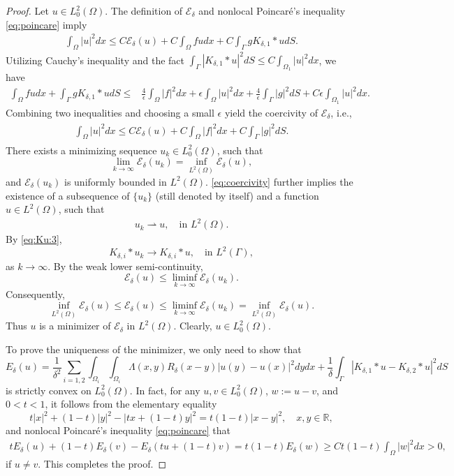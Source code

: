 \documentclass[10pt,a4paper]{amsart}
\newcommand{\R}{\mathbb{R}}
\begin{document}
\begin{proof}
  Let $u\in L^2_0(\Omega)$.
  The definition of $\mathcal{E}_\delta$ and nonlocal Poincar\'{e}'s inequality \eqref{eq:poincare} imply
  \begin{align*}
    \int_\Omega |u|^2dx
    \leq C\mathcal{E}_\delta(u)
    +C\int_{\Omega}fudx + C\int_\Gamma g K_{\delta,1}\ast u dS.
  \end{align*}
  Utilizing Cauchy's inequality and the fact
  $\int_\Gamma |K_{\delta,1}\ast u|^2dS\leq C\int_{\Omega_1}|u|^2dx$,
  we have
  \begin{align*}
  \int_{\Omega}fudx + \int_\Gamma gK_{\delta,1}\ast u dS
  \leq& \frac{4}{\epsilon}\int_\Omega |f|^2dx
  +\epsilon\int_\Omega |u|^2dx
  +\frac{4}{\epsilon}\int_\Gamma |g|^2dS
  +C\epsilon \int_{\Omega_1}|u|^2dx.
  \end{align*}
  Combining two inequalities and choosing a small $\epsilon$ yield the coercivity of $\mathcal{E}_\delta$, i.e.,
    \begin{align}\label{eq:coercivity}
  \begin{split}
    \int_\Omega|u|^2dx
    \leq C\mathcal{E}_\delta(u)+C\int_\Omega |f|^2dx + C\int_\Gamma |g|^2dS.
  \end{split}
  \end{align}
There exists a minimizing sequence $u_k\in L_0^2(\Omega)$, such that
\[
\lim_{k\rightarrow\infty}\mathcal{E}_\delta(u_k)=\inf_{L^2(\Omega)} \mathcal{E}_\delta(u),
\]
and $\mathcal{E}_\delta(u_k)$ is uniformly bounded in $L^2(\Omega)$.
\eqref{eq:coercivity} further implies the existence of a subsequence of $\{u_k\}$ (still denoted by itself) and a function $u\in L^2(\Omega)$, such that
\begin{align*}
  u_{k} \rightharpoonup {u}, \quad \mbox{in } L^2(\Omega).
\end{align*}
By \eqref{eq:Ku:3},
  \[
  K_{\delta,i}\ast u_k\rightarrow K_{\delta,i}\ast u, \quad \mbox{in } L^2(\Gamma),
  \]
  as $k\rightarrow \infty$.
 By the weak lower semi-continuity,
\[
\mathcal{E}_\delta(u)
\leq \liminf_{k\rightarrow\infty}\mathcal{E}_\delta(u_k).
\]
Consequently,
\[
\inf_{L^2(\Omega)} \mathcal{E}_\delta(u)
\leq \mathcal{E}_\delta(u)
\leq \liminf_{k\rightarrow\infty}\mathcal{E}_\delta(u_k)
=\inf_{L^2(\Omega)} \mathcal{E}_\delta(u).
\]
Thus $u$ is a minimizer of $\mathcal{E}_\delta$ in $L^2(\Omega)$.
Clearly, $u\in L^2_0(\Omega)$.

To prove the uniqueness of the minimizer, we only need to show that
\[
E_\delta(u)=
\frac{1}{\delta^2}\sum_{i=1,2}\int_{\Omega_i}\int_{\Omega_i}\Lambda(x,y) R_\delta(x-y)|u(y)-u(x)|^2dydx
+\frac{1}{\delta}
\int_\Gamma\left|K_{\delta,1}\ast u-K_{\delta,2}\ast u\right|^2dS
\]
is strictly convex on $L^2_0(\Omega)$.
In fact, for any $u,v\in L^2_0(\Omega)$, $w:=u-v$, and $0<t<1$,
it follows from the elementary equality
\[
t|x|^2+(1-t)|y|^2-|tx+(1-t)y|^2=t(1-t)|x-y|^2,\quad x,y\in\R,
\]
and nonlocal Poincar\'{e}'s inequality \eqref{eq:poincare}
that
\begin{align*}
tE_\delta(u)+(1-t)E_\delta(v)-E_\delta(tu+(1-t)v)
=t(1-t)E_\delta(w)
\geq Ct(1-t)\int_\Omega |w|^2dx>0,
\end{align*}
if $u\neq v$.
This completes the proof.
\end{proof}
\end{document}
